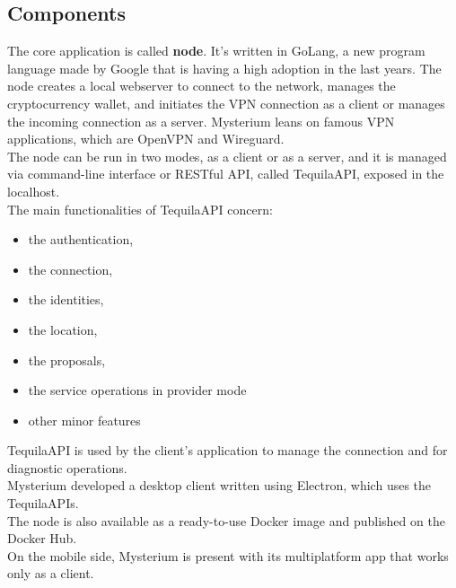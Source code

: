 \documentclass[12pt]{article}
\begin{document}
	\subsection{Components}
	The core application is called \textbf{node}. It's written in GoLang, a new program language made by Google that is having a high adoption in the last years. The node creates a local webserver to connect to the network, manages the cryptocurrency wallet, and initiates the VPN connection as a client or manages the incoming connection as a server. Mysterium leans on famous VPN applications, which are OpenVPN and Wireguard.\\
	The node can be run in two modes, as a client or as a server, and it is managed via command-line interface or RESTful API, called TequilaAPI, exposed in the localhost.\\
	\bigbreak
	The main functionalities of TequilaAPI concern:
	\begin{itemize}
		\item the authentication,
		\item the connection,
		\item the identities,
		\item the location,
		\item the proposals,
		\item the service operations in provider mode
		\item other minor features
	\end{itemize}
	\bigbreak

	TequilaAPI is used by the client's application to manage the connection and for diagnostic operations.\\
	Mysterium developed a desktop client written using Electron, which uses the TequilaAPIs.\\
	The node is also available as a ready-to-use Docker image and published on the Docker Hub.\\
	On the mobile side, Mysterium is present with its multiplatform app that works only as a client.\\
	
	\bigbreak
\end{document}
